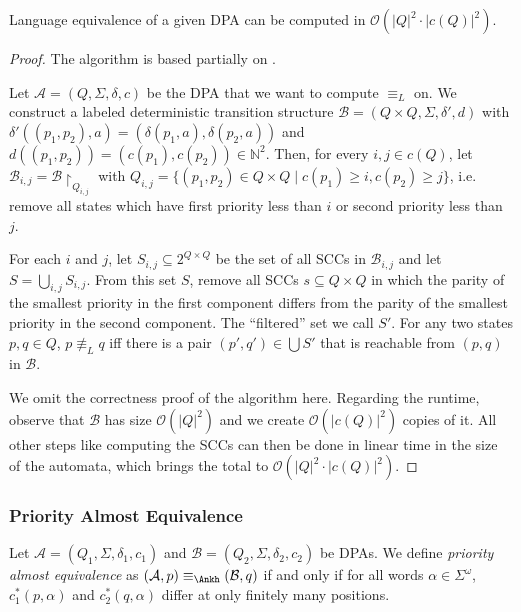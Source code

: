 \begin{lem}
	Language equivalence of a given DPA can be computed in $\mathcal{O}(|Q|^2 \cdot |c(Q)|^2)$.
\end{lem}

\begin{proof}
	The algorithm is based partially on \cite{HenzingerTelle1996}.
	
	Let $\mathcal{A} = (Q, \Sigma, \delta, c)$ be the DPA that we want to compute $\equiv_L$ on. We construct a labeled deterministic transition structure $\mathcal{B} = (Q \times Q, \Sigma, \delta', d)$ with $\delta'((p_1, p_2), a) = (\delta(p_1, a), \delta(p_2, a))$ and $d((p_1, p_2)) = (c(p_1), c(p_2)) \in \mathbb{N}^2$. Then, for every $i, j \in c(Q)$, let $\mathcal{B}_{i,j} = \mathcal{B} \upharpoonright_{Q_{i,j}}$ with $Q_{i,j} = \{ (p_1, p_2) \in Q \times Q \mid c(p_1) \geq i, c(p_2) \geq j \}$, i.e. remove all states which have first priority less than $i$ or second priority less than $j$.
	
	For each $i$ and $j$, let $S_{i,j} \subseteq 2^{Q \times Q}$ be the set of all SCCs in $\mathcal{B}_{i,j}$ and let $S = \bigcup_{i,j} S_{i,j}$. From this set $S$, remove all SCCs $s \subseteq Q \times Q$ in which the parity of the smallest priority in the first component differs from the parity of the smallest priority in the second component. The \enquote{filtered} set we call $S'$. For any two states $p, q \in Q$, $p \not\equiv_L q$ iff there is a pair $(p', q') \in \bigcup S'$ that is reachable from $(p, q)$ in $\mathcal{B}$.
	
	We omit the correctness proof of the algorithm here. Regarding the runtime, observe that $\mathcal{B}$ has size $\mathcal{O}(|Q|^2)$ and we create $\mathcal{O}(|c(Q)|^2)$ copies of it. All other steps like computing the SCCs can then be done in linear time in the size of the automata, which brings the total to $\mathcal{O}(|Q|^2 \cdot |c(Q)|^2)$.
\end{proof}

\vspace{5pt}

\subsubsection{Priority Almost Equivalence}

\begin{defn}
	Let $\mathcal{A} = (Q_1, \Sigma, \delta_1, c_1)$ and $\mathcal{B} = (Q_2, \Sigma, \delta_2, c_2)$ be DPAs. We define \emph{priority almost equivalence} as $(\mathcal{A}, p) \equiv_\text{\Ankh} (\mathcal{B}, q)$ if and only if for all words $\alpha \in \Sigma^\omega$, $c_1^*(p, \alpha)$ and $c_2^*(q, \alpha)$ differ at only finitely many positions.
\end{defn}

